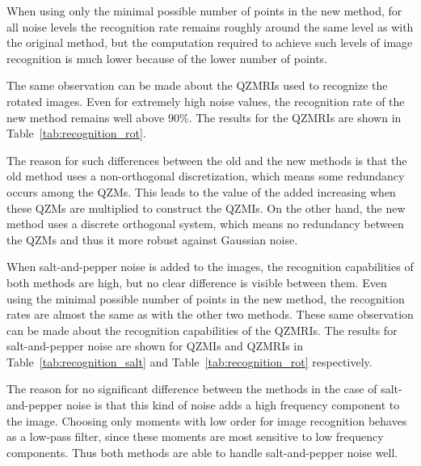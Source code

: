 When using only the minimal possible number of points in the new method, for all noise levels the recognition rate remains roughly around the same level as with the original method, but the computation required to achieve such levels of image recognition is much lower because of the lower number of points.

The same observation can be made about the QZMRIs used to recognize the rotated images. Even for extremely high noise values, the recognition rate of the new method remains well above 90\%. The results for the QZMRIs are shown in Table~\ref{tab:recognition_rot}.

The reason for such differences between the old and the new methods is that the old method uses a non-orthogonal discretization, which means some redundancy occurs among the QZMs. This leads to the value of the added increasing when these QZMs are multiplied to construct the QZMIs. On the other hand, the new method uses a discrete orthogonal system, which means no redundancy between the QZMs and thus it more robust against Gaussian noise.

When salt-and-pepper noise is added to the images, the recognition capabilities of both methods are high, but no clear difference is visible between them. Even using the minimal possible number of points in the new method, the recognition rates are almost the same as with the other two methods. 
These same observation can be made about the recognition capabilities of the QZMRIs.
The results for salt-and-pepper noise are shown for QZMIs and QZMRIs in Table~\ref{tab:recognition_salt} and Table~\ref{tab:recognition_rot} respectively.

The reason for no significant difference between the methods in the case of salt-and-pepper noise is that this kind of noise adds a high frequency component to the image. Choosing only moments with low order for image recognition behaves as a low-pass filter, since these moments are most sensitive to low frequency components. Thus both methods are able to handle salt-and-pepper noise well.


